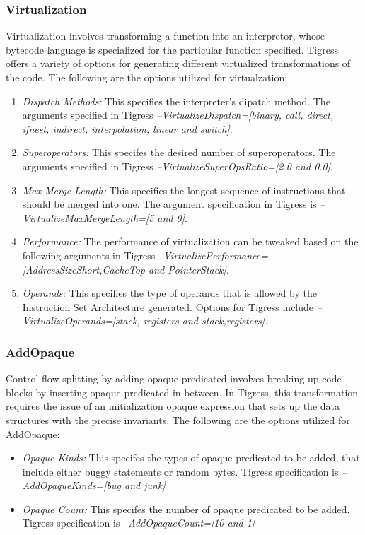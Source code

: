 \subsubsection{Virtualization}
Virtualization involves transforming a function into an interpretor, whose bytecode language is specialized for the particular function specified. Tigress offers a variety of options for generating different virtualized transformations of the code. The following are the options utilized for virtualzation:
\begin{enumerate}
\item \textit{Dispatch Methods:} This specifies the interpreter's dipatch method. The arguments specified in Tigress \textit{--VirtualizeDispatch=[binary, call, direct, ifnest, indirect, interpolation, linear and switch]}.
\item \textit{Superoperators:} This specifes the desired number of superoperators. The arguments specified in Tigress \textit{--VirtualizeSuperOpsRatio=[2.0 and 0.0]}.
\item \textit{Max Merge Length:} This specifies the longest sequence of instructions that should be merged into one. The argument specification in Tigress is \textit{--VirtualizeMaxMergeLength=[5 and 0]}.
\item \textit{Performance:} The performance of virtualization can be tweaked based on the following arguments in Tigress \textit{--VirtualizePerformance=[AddressSizeShort,CacheTop and PointerStack]}.
\item \textit{Operands:} This specifies the type of operands that is allowed by the Instruction Set Architecture generated. Options for Tigress include \textit{--VirtualizeOperands=[stack, registers and stack,registers]}.
\end{enumerate}

\subsubsection{AddOpaque}
Control flow splitting by adding opaque predicated involves breaking up code blocks by inserting opaque predicated in-between. In Tigress, this transformation requires the issue of an initialization opaque expression that sets up the data structures with the precise invariants. The following are the options utilized for AddOpaque:
\begin{itemize}
\item \textit{Opaque Kinds:} This specifes the types of opaque predicated to be added, that include either buggy statements or random bytes. Tigress specification is \textit{--AddOpaqueKinds=[bug and junk]}
\item \textit{Opaque Count:} This specifes the number of opaque predicated to be added. Tigress specification is \textit{--AddOpaqueCount=[10 and 1]}
\end{itemize}

